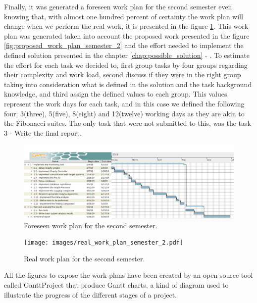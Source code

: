 Finally, it was generated a foreseen work plan for the second semester even knowing that, with almost one hundred percent of certainty the work plan will change when we perform the real work, it is presented in the figure \ref{fig:foreseen_work_plan_semester_2}. This work plan was generated taken into account the proposed work presented in the figure \ref{fig:proposed_work_plan_semester_2} and the effort needed to implement the defined solution presented in the chapter \ref{chap:possible_solution} - . To estimate the effort for each task we decided to, first group tasks by four groups regarding their complexity and work load, second discuss if they were in the right group taking into consideration what is defined in the solution and the task background knowledge, and third assign the defined values to each group. This values represent the work days for each task, and in this case we defined the following four: 3(three), 5(five), 8(eight) and 12(twelve) working days as they are akin to the Fibonacci suites\cite{project_estimation_times}. The only task that were not submitted to this, was the task 3 - Write the final report.

\begin{figure}[H]
    \centering
    \includegraphics[width=1.00\textwidth]{images/foreseen_work_plan_semester_2.pdf}
    \caption{Foreseen work plan for the second semester.}
    \label{fig:foreseen_work_plan_semester_2}
\end{figure}

\begin{figure}[H]
    \centering
    \texttt{[image: images/real\_work\_plan\_semester\_2.pdf]}
    \caption{Real work plan for the second semester.}
    \label{fig:real_work_plan_semester_2}
\end{figure}

All the figures to expose the work plans have been created by an open-source tool called GanttProject\cite{gantt_project_tool} that produce Gantt charts, a kind of diagram used to illustrate the progress of the different stages of a project.


\checkoddpage
{}
{ %
\newpage
\blankpage}
{ %
}
